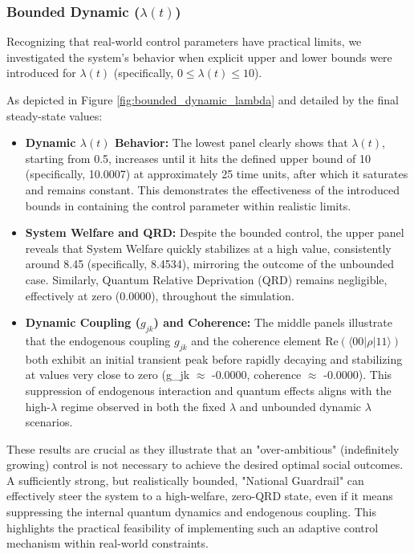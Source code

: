 \documentclass[9pt]{article}
\begin{document}
\subsubsection{Bounded Dynamic \texorpdfstring{($\lambda(t)$)}{(lambda(t))}} \label{sec:dynamic_lambda_bounded_section}
Recognizing that real-world control parameters have practical limits, we investigated the system's behavior when explicit upper and lower bounds were introduced for $\lambda(t)$ (specifically, $0 \le \lambda(t) \le 10$).

As depicted in Figure \ref{fig:bounded_dynamic_lambda} and detailed by the final steady-state values:
\begin{itemize}
    \item \textbf{Dynamic $\lambda(t)$ Behavior:} The lowest panel clearly shows that $\lambda(t)$, starting from 0.5, increases until it hits the defined upper bound of 10 (specifically, 10.0007) at approximately 25 time units, after which it saturates and remains constant. This demonstrates the effectiveness of the introduced bounds in containing the control parameter within realistic limits.
    \item \textbf{System Welfare and QRD:} Despite the bounded control, the upper panel reveals that System Welfare quickly stabilizes at a high value, consistently around 8.45 (specifically, 8.4534), mirroring the outcome of the unbounded case. Similarly, Quantum Relative Deprivation (QRD) remains negligible, effectively at zero (0.0000), throughout the simulation.
    \item \textbf{Dynamic Coupling ($g_{jk}$) and Coherence:} The middle panels illustrate that the endogenous coupling $g_{jk}$ and the coherence element $\text{Re}(\langle 00|\rho|11\rangle)$ both exhibit an initial transient peak before rapidly decaying and stabilizing at values very close to zero (g\_jk $\approx$ -0.0000, coherence $\approx$ -0.0000). This suppression of endogenous interaction and quantum effects aligns with the high-$\lambda$ regime observed in both the fixed $\lambda$ and unbounded dynamic $\lambda$ scenarios.
\end{itemize}
These results are crucial as they illustrate that an "over-ambitious" (indefinitely growing) control is not necessary to achieve the desired optimal social outcomes. A sufficiently strong, but realistically bounded, "National Guardrail" can effectively steer the system to a high-welfare, zero-QRD state, even if it means suppressing the internal quantum dynamics and endogenous coupling. This highlights the practical feasibility of implementing such an adaptive control mechanism within real-world constraints.
\end{document}
